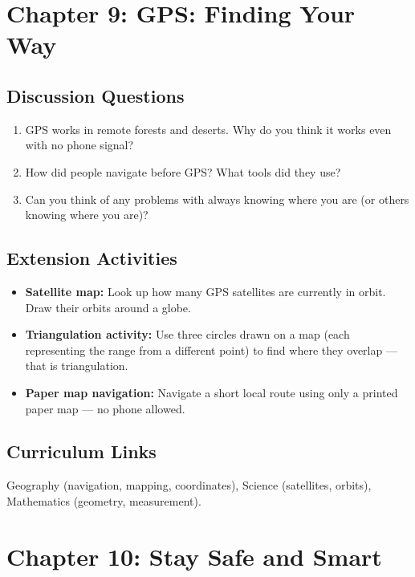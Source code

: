 \sectionrule

\section*{Chapter 9: GPS: Finding Your Way}

\subsection*{Discussion Questions}
\begin{enumerate}
  \item GPS works in remote forests and deserts. Why do you think it works even with no phone signal?
  \item How did people navigate before GPS? What tools did they use?
  \item Can you think of any problems with always knowing where you are (or others knowing where you are)?
\end{enumerate}

\subsection*{Extension Activities}
\begin{itemize}
  \item \textbf{Satellite map:} Look up how many GPS satellites are currently in orbit. Draw their orbits around a globe.
  \item \textbf{Triangulation activity:} Use three circles drawn on a map (each representing the range from a different point) to find where they overlap — that is triangulation.
  \item \textbf{Paper map navigation:} Navigate a short local route using only a printed paper map — no phone allowed.
\end{itemize}

\subsection*{Curriculum Links}
Geography (navigation, mapping, coordinates), Science (satellites, orbits), Mathematics (geometry, measurement).

\sectionrule

\section*{Chapter 10: Stay Safe and Smart}

